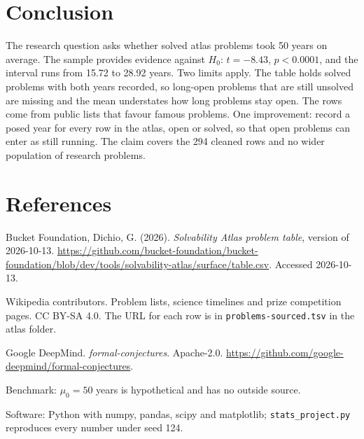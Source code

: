 \documentclass[11pt]{article}
\begin{document}
\section*{Conclusion}
\noindent{}

\medskip
The research question asks whether solved atlas problems took 50 years on average. The sample provides evidence against $H_0$: $t = -8.43$, $p < 0.0001$, and the interval runs from 15.72 to 28.92 years. Two limits apply. The table holds solved problems with both years recorded, so long-open problems that are still unsolved are missing and the mean understates how long problems stay open. The rows come from public lists that favour famous problems. One improvement: record a posed year for every row in the atlas, open or solved, so that open problems can enter as still running. The claim covers the 294 cleaned rows and no wider population of research problems.


\section*{References}

Bucket Foundation, Dichio, G. (2026). \emph{Solvability Atlas problem table}, version of 2026-10-13. \url{https://github.com/bucket-foundation/bucket-foundation/blob/dev/tools/solvability-atlas/surface/table.csv}. Accessed 2026-10-13.

Wikipedia contributors. Problem lists, science timelines and prize competition pages. CC BY-SA 4.0. The URL for each row is in \texttt{problems-sourced.tsv} in the atlas folder.

Google DeepMind. \emph{formal-conjectures}. Apache-2.0. \url{https://github.com/google-deepmind/formal-conjectures}.

Benchmark: $\mu_0 = 50$ years is hypothetical and has no outside source.

Software: Python with numpy, pandas, scipy and matplotlib; \texttt{stats\_project.py} reproduces every number under seed 124.
\end{document}
